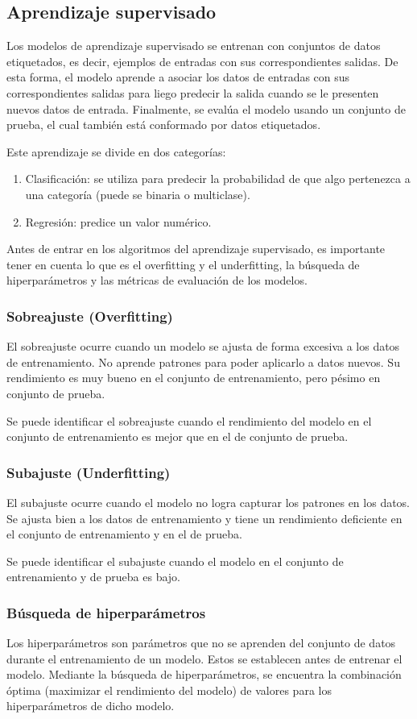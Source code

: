 \documentclass[a4paper, 12pt]{book}
\begin{document}
\subsection{Aprendizaje supervisado}
Los modelos de aprendizaje supervisado se entrenan con conjuntos de datos etiquetados, es decir, ejemplos de entradas con sus correspondientes salidas. De esta forma, el modelo aprende a asociar los datos de entradas con sus correspondientes salidas para liego predecir la salida cuando se le presenten nuevos datos de entrada. Finalmente, se evalúa el modelo usando un conjunto de prueba, el cual también está conformado por datos etiquetados.

Este aprendizaje se divide en dos categorías:
\begin{enumerate}
	\item Clasificación: se utiliza para predecir la probabilidad de que algo pertenezca a una categoría (puede se binaria o multiclase).
	\item Regresión: predice un valor numérico.
\end{enumerate}
Antes de entrar en los algoritmos del aprendizaje supervisado, es importante tener en cuenta lo que es el overfitting y el underfitting, la búsqueda de hiperparámetros y las métricas de evaluación de los modelos.
\subsubsection{Sobreajuste (Overfitting)}
El sobreajuste ocurre cuando un modelo se ajusta de forma excesiva a los datos de entrenamiento. No aprende patrones para poder aplicarlo a datos nuevos. Su rendimiento es muy bueno en el conjunto de entrenamiento, pero pésimo en conjunto de prueba.

Se puede identificar el sobreajuste cuando el rendimiento del modelo en el conjunto de entrenamiento es mejor que en el de conjunto de prueba.

\subsubsection{Subajuste (Underfitting)}
El subajuste ocurre cuando el modelo no logra capturar los patrones en los datos. Se ajusta bien a los datos de entrenamiento y tiene un rendimiento deficiente en el conjunto de entrenamiento y en el de prueba.

Se puede identificar el subajuste cuando el modelo en el conjunto de entrenamiento y de prueba es bajo.

\subsubsection{Búsqueda de hiperparámetros}
Los hiperparámetros son parámetros que no se aprenden del conjunto de datos durante el entrenamiento de un modelo. Estos se establecen antes de entrenar el modelo. Mediante la búsqueda de hiperparámetros, se encuentra la combinación óptima (maximizar el rendimiento del modelo) de valores para los hiperparámetros de dicho modelo.
\end{document}
